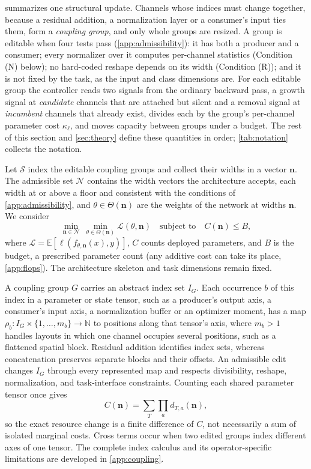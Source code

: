 \documentclass[10pt]{article}
\theoremstyle{paper}
\newcommand{\E}{\mathbb E}
\newcommand{\Lcal}{\mathcal L}
\newcommand{\Sset}{\mathcal S}
\begin{document}
 summarizes one structural update. Channels whose indices must change together, because a residual addition, a normalization layer or a consumer's input ties them, form a \emph{coupling group}, and only whole groups are resized. A group is editable when four tests pass (\cref{app:admissibility}): it has both a producer and a consumer; every normalizer over it computes per-channel statistics (Condition (N) below); no hard-coded reshape depends on its width (Condition (R)); and it is not fixed by the task, as the input and class dimensions are. For each editable group the controller reads two signals from the ordinary backward pass, a growth signal at \emph{candidate} channels that are attached but silent and a removal signal at \emph{incumbent} channels that already exist, divides each by the group's per-channel parameter cost $\kappa_\ell$, and moves capacity between groups under a budget. The rest of this section and \cref{sec:theory} define these quantities in order; \cref{tab:notation} collects the notation.

Let $\Sset$ index the editable coupling groups and collect their widths in a vector $\bm n$. The admissible set $\mathcal N$ contains the width vectors the architecture accepts, each width at or above a floor and consistent with the conditions of \cref{app:admissibility}, and $\theta\in\Theta(\bm n)$ are the weights of the network at widths $\bm n$. We consider
\begin{equation}
\min_{\bm n\in\mathcal N}\ \min_{\theta\in\Theta(\bm n)}
\Lcal(\theta,\bm n)\quad\text{subject to}\quad C(\bm n)\le B,
\label{eq:problem}
\end{equation}
where $\Lcal=\E[\ell(f_{\theta,\bm n}(x),y)]$, $C$ counts deployed parameters, and $B$ is the budget, a prescribed parameter count (any additive cost can take its place, \cref{app:flops}). The architecture skeleton and task dimensions remain fixed.

A coupling group $G$ carries an abstract index set $I_G$. Each occurrence $b$ of this index in a parameter or state tensor, such as a producer's output axis, a consumer's input axis, a normalization buffer or an optimizer moment, has a map $\rho_b:I_G\times\{1,\ldots,m_b\}\to\mathbb N$ to positions along that tensor's axis, where $m_b>1$ handles layouts in which one channel occupies several positions, such as a flattened spatial block. Residual addition identifies index sets, whereas concatenation preserves separate blocks and their offsets. An admissible edit changes $I_G$ through every represented map and respects divisibility, reshape, normalization, and task-interface constraints. Counting each shared parameter tensor once gives
\begin{equation}
C(\bm n)=\sum_T\prod_a d_{T,a}(\bm n),
\label{eq:main-cost}
\end{equation}
so the exact resource change is a finite difference of $C$, not necessarily a sum of isolated marginal costs. Cross terms occur when two edited groups index different axes of one tensor. The complete index calculus and its operator-specific limitations are developed in \cref{app:coupling}.
\end{document}
